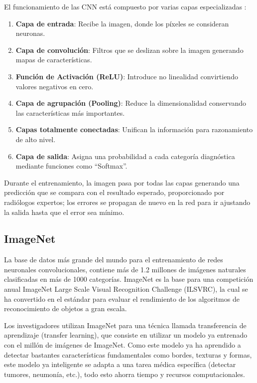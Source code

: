 El funcionamiento de las CNN está compuesto por varias capas especializadas \parencite[p.~28]{Seeram2024}:

\begin{enumerate}
    \item \textbf{Capa de entrada}: Recibe la imagen, donde los píxeles se consideran neuronas.
    \item \textbf{Capa de convolución}: Filtros que se deslizan sobre la imagen generando mapas de características.
    \item \textbf{Función de Activación (ReLU)}: Introduce no linealidad convirtiendo valores negativos en cero.
    \item \textbf{Capa de agrupación (Pooling)}: Reduce la dimensionalidad conservando las características más importantes.
    \item \textbf{Capas totalmente conectadas}: Unifican la información para razonamiento de alto nivel.
    \item \textbf{Capa de salida}: Asigna una probabilidad a cada categoría diagnóstica mediante funciones como \enquote{Softmax}.
\end{enumerate}

Durante el entrenamiento, la imagen pasa por todas las capas generando una predicción que se compara con el resultado esperado, proporcionado por radiólogos expertos; los errores se propagan de nuevo en la red para ir ajustando la salida hasta que el error sea mínimo.

\subsection{ImageNet}
La base de datos más grande del mundo para el entrenamiento de redes neuronales convolucionales, contiene más de 1.2 millones de imágenes naturales clasificadas en más de 1000 categorías. ImageNet es la base para una competición anual ImageNet Large Scale Visual Recognition Challenge (ILSVRC), la cual se ha convertido en el estándar para evaluar el rendimiento de los algoritmos de reconocimiento de objetos a gran escala.

Los investigadores utilizan ImageNet para una técnica llamada transferencia de aprendizaje (transfer learning), que consiste en utilizar un modelo ya entrenado con el millón de imágenes de ImageNet. Como este modelo ya ha aprendido a detectar bastantes características fundamentales como bordes, texturas y formas, este modelo ya inteligente se adapta a una tarea médica específica (detectar tumores, neumonía, etc.), todo esto ahorra tiempo y recursos computacionales.


